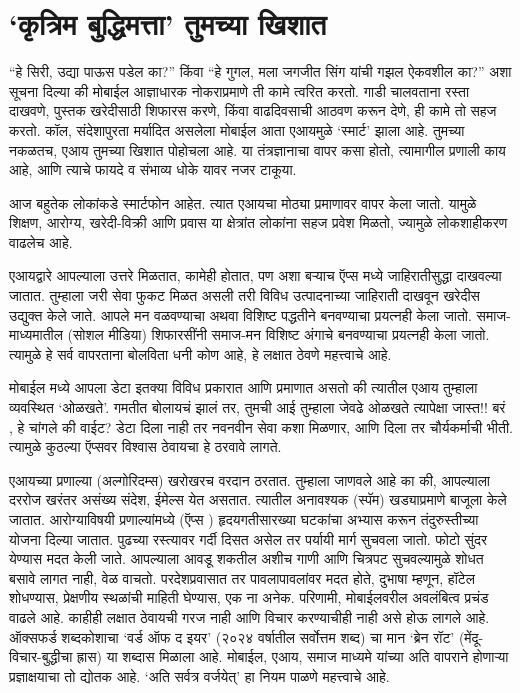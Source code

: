 \chapter{`कृत्रिम बुद्धिमत्ता' तुमच्या खिशात}

``हे सिरी, उद्या पाऊस पडेल का?'' किंवा ``हे गुगल, मला जगजीत सिंग यांची गझल ऐकवशील का?'' अशा सूचना दिल्या की मोबाईल आज्ञाधारक नोकराप्रमाणे ती कामे त्वरित करतो. गाडी चालवताना रस्ता दाखवणे, पुस्तक खरेदीसाठी शिफारस करणे, किंवा वाढदिवसाची आठवण करून देणे, ही कामे तो सहज करतो. कॉल, संदेशापुरता मर्यादित असलेला मोबाईल आता एआयमुळे `स्मार्ट' झाला आहे. तुमच्या नकळतच, एआय तुमच्या खिशात पोहोचला आहे. या तंत्रज्ञानाचा वापर कसा होतो, त्यामागील प्रणाली काय आहे, आणि त्याचे फायदे व संभाव्य धोके यावर नजर टाकूया.

आज बहुतेक लोकांकडे स्मार्टफोन आहेत. त्यात एआयचा मोठ्या प्रमाणावर वापर केला जातो. यामुळे शिक्षण, आरोग्य, खरेदी-विक्री आणि प्रवास या क्षेत्रांत लोकांना सहज प्रवेश मिळतो, ज्यामुळे लोकशाहीकरण वाढलेच आहे.

एआयद्वारे आपल्याला उत्तरे मिळतात, कामेही होतात, पण अशा बऱ्याच ऍप्स मध्ये जाहिरातीसुद्धा दाखवल्या जातात. तुम्हाला जरी सेवा फुकट मिळत असली तरी विविध उत्पादनाच्या जाहिराती दाखवून खरेदीस उद्युक्त केले जाते. आपले मन वळवण्याचा अथवा विशिष्ट पद्धतीने बनवण्याचा प्रयत्नही केला जातो. समाज-माध्यमातील (सोशल मीडिया) शिफारसींनी समाज-मन विशिष्ट अंगाचे बनवण्याचा प्रयत्नही केला जातो. त्यामुळे हे सर्व वापरताना बोलविता धनी कोण आहे, हे लक्षात ठेवणे महत्त्वाचे आहे.

मोबाईल मध्ये आपला डेटा इतक्या विविध प्रकारात आणि प्रमाणात असतो की त्यातील एआय तुम्हाला व्यवस्थित `ओळखते'. गमतीत बोलायचं झालं तर, तुमची आई तुम्हाला जेवढे ओळखते त्यापेक्षा जास्त!! बरं , हे चांगले की वाईट? डेटा दिला नाही तर नवनवीन सेवा कशा मिळणार, आणि दिला तर चौर्यकर्माची भीती. त्यामुळे कुठल्या ऍप्सवर विश्वास ठेवायचा हे ठरवावे लागते.

एआयच्या प्रणाल्या (अल्गोरिदम्स) खरोखरच वरदान ठरतात. तुम्हाला जाणवले आहे का की, आपल्याला दररोज खरंतर असंख्य संदेश, ईमेल्स येत असतात. त्यातील अनावश्यक (स्पॅम) खड्याप्रमाणे बाजूला केले जातात. आरोग्याविषयी प्रणाल्यांमध्ये (ऍप्स ) हृदयगतीसारख्या घटकांचा अभ्यास करून तंदुरुस्तीच्या योजना दिल्या जातात. पुढच्या रस्त्यावर गर्दी दिसत असेल तर पर्यायी मार्ग सुचवला जातो. फोटो सुंदर येण्यास मदत केली जाते. आपल्याला आवडू शकतील अशीच गाणी आणि चित्रपट सुचवल्यामुळे शोधत बसावे लागत नाही, वेळ वाचतो. परदेशप्रवासात तर पावलापावलांवर मदत होते, दुभाषा म्हणून, हॉटेल शोधण्यास, प्रेक्षणीय स्थळांची माहिती घेण्यास, एक ना अनेक. परिणामी, मोबाईलवरील अवलंबित्व प्रचंड वाढले आहे. काहीही लक्षात ठेवायची गरज नाही आणि विचार करण्याचीही नाही असे होऊ लागले आहे. ऑक्सफर्ड शब्दकोशाचा `वर्ड ऑफ द इयर' (२०२४ वर्षातील सर्वोत्तम शब्द) चा मान `ब्रेन रॉट' (मेंदू-विचार-बुद्धीचा ह्रास) या शब्दास मिळाला आहे. मोबाईल, एआय, समाज माध्यमे यांच्या अति वापराने होणाऱ्या प्रज्ञाक्षयाचा तो द्योतक आहे. `अति सर्वत्र वर्जयेत्' हा नियम पाळणे महत्त्वाचे आहे.

